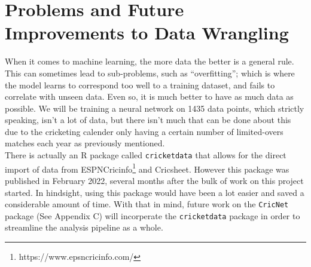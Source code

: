 \section{Problems and Future Improvements to Data Wrangling}
When it comes to machine learning, the more data the better is a general rule. This can sometimes lead to sub-problems, such as ``overfitting''; which is where the model 
learns to correspond too well to a training dataset, and fails to correlate with unseen data. Even so,  
it is much better to have as much data as possible. We will be training a neural network on 1435 data points, which strictly speaking, isn't a lot of data, but there
isn't much that can be done about this due to the cricketing calender only having a certain number of limited-overs matches each year as previously mentioned. \\

There is actually an R package called \verb|cricketdata| that allows for the direct import of data from ESPNCricinfo\footnote{https://www.epsncricinfo.com/}
and Cricsheet. However this package was published in February 2022, several months after the bulk of work on this project started. In hindsight, using this package 
would have been a lot easier and saved a considerable amount of time. With that in mind, future work on the \verb|CricNet| package (See Appendix C)
will incorperate the \verb|cricketdata| package in order to streamline the analysis pipeline as a whole. 

